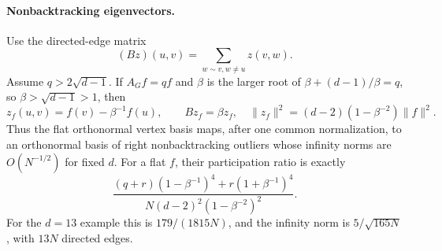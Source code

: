 \documentclass[11pt]{article}
\begin{document}
\paragraph{Nonbacktracking eigenvectors.}
Use the directed-edge matrix
\[
 (Bz)(u,v)=\sum_{w\sim v,w\ne u}z(v,w).
\]
Assume $q>2\sqrt{d-1}$. If $A_Gf=qf$ and $\beta$ is the larger root of
$\beta+(d-1)/\beta=q$, so $\beta>\sqrt{d-1}>1$, then
\[
 z_f(u,v)=f(v)-\beta^{-1}f(u),\qquad Bz_f=\beta z_f,
 \quad \|z_f\|^2=(d-2)(1-\beta^{-2})\|f\|^2.
\]
Thus the flat orthonormal vertex basis maps, after one common
normalization, to an orthonormal basis of right nonbacktracking outliers
whose infinity norms are $O(N^{-1/2})$ for fixed $d$.
For a flat $f$, their participation ratio is exactly
\[
 \frac{(q+r)(1-\beta^{-1})^4+r(1+\beta^{-1})^4}
 {N(d-2)^2(1-\beta^{-2})^2}.
\]
For the $d=13$ example this is $179/(1815N)$, and the infinity norm is
$5/\sqrt{165N}$, with $13N$ directed edges.
\end{document}
